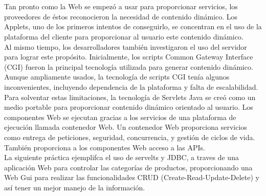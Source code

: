 \documentclass[10pt,a4paper]{article}
\begin{document}
\section{\color{colorIPN}{Introducción}}
\normalsize{
Tan pronto como la Web se empezó a usar para proporcionar servicios, los
proveedores de éstos reconocieron la necesidad de contenido dinámico. Los Applets,
uno de los primeros intentos de conseguirlo, se concentran en el uso de la plataforma
del cliente para proporcionar al usuario este contenido dinámico.
\\
Al mismo tiempo, los desarrolladores también investigaron el uso del servidor
para lograr este propósito. Inicialmente, los scripts Common Gateway Interface (CGI)
fueron la principal tecnología utilizada para generar contenido dinámico. Aunque
ampliamente usados, la tecnología de scripts CGI tenía algunos inconvenientes,
incluyendo dependencia de la plataforma y falta de escalabilidad. Para solventar estas
limitaciones, la tecnología de Servlets Java se creó como un medio portable para
proporcionar contenido dinámico orientado al usuario.  Los componentes Web se ejecutan gracias a los servicios de una plataforma de ejecución llamada contenedor Web. Un contenedor Web proporciona servicios como entrega de peticiones, seguridad, concurrencia, y gestión de ciclos de vida. También
proporciona a los componentes Web acceso a las APIs. 
\\
La siguiente práctica ejemplifca el uso de servelts y JDBC, a traves de una aplicación Web para
controlar las categorías de productos, proporcionando una Web Gui para realizar las funcionalidades CRUD (Create-Read-Update-Delete) y así tener un mejor manejo de la información.

}

\section{\color{colorIPN}{Definiciones}}
\end{document}
